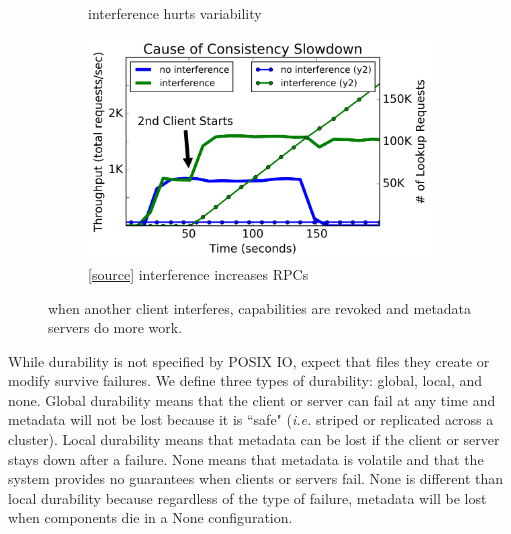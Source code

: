 \begin{figure}[t]
\begin{subfigure}[b]{.32\linewidth}
{      interference hurts variability}
      \label{fig:overhead-b}
  \end{subfigure}
  \begin{subfigure}[b]{.32\linewidth}
      \centering
      \includegraphics[width=1.15\linewidth]{./chapters/cudele/figures/behavior-interfere.png}
      \caption{[\href{https://github.com/michaelsevilla/cudele-popper/blob/master/experiments/baseline-interfere/visualize/viz.ipynb}{source}]
      interference increases RPCs}
      \label{fig:overhead-c}
  \end{subfigure}
  \caption{ when another client interferes, capabilities are revoked and
metadata servers do more work.} \label{fig:overhead}
\end{figure}

While durability is not specified by POSIX IO,
 expect that files they create or
modify survive failures.  We define three types of durability: global, local,
and none.  Global durability means that the client or server can fail at any
time and metadata will not be lost because it is ``safe" ({\it i.e.} striped or
replicated across a cluster). Local durability means that metadata can be lost
if the client or server stays down after a failure. None means that metadata is
volatile and that the system provides no guarantees when clients or servers
fail.  None is different than local durability because regardless of the type
of failure, metadata will be lost when components die in a None configuration.

